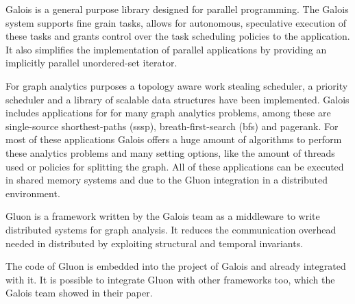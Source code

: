 
Galois\cite{Galois} is a general purpose library designed for parallel programming. The Galois system supports fine grain tasks, allows for autonomous, speculative execution of these tasks and grants control over the task scheduling policies to the application. It also simplifies the implementation of parallel applications by providing an implicitly parallel unordered-set iterator.

For graph analytics purposes a topology aware work stealing scheduler, a priority scheduler and a library of scalable data structures have been implemented. Galois includes applications for for many graph analytics problems, among these are single-source shorthest-paths (sssp), breath-first-search (bfs) and pagerank. For most of these applications Galois offers a huge amount of algorithms to perform these analytics problems and many setting options, like the amount of threads used or policies for splitting the graph. All of these applications can be executed in shared memory systems and due to the Gluon integration in a distributed environment.

Gluon\cite{vertGalois} is a framework written by the Galois team as a middleware to write distributed systems for graph analysis. It reduces the communication overhead needed in distributed by exploiting structural and temporal invariants.

The code of Gluon is embedded into the project of Galois and already integrated with it. It is possible to integrate Gluon with other frameworks too, which the Galois team showed in their paper\cite{vertGalois}.
